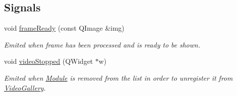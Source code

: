 \subsection*{Signals}
\begin{DoxyCompactItemize}
\item 
void \hyperlink{class_module_aca320affcf9e924d453e41afccb2c038}{frameReady} (const QImage \&img)
\begin{DoxyCompactList}\small\item\em Emited when frame has been processed and is ready to be shown. \item\end{DoxyCompactList}\item 
void \hyperlink{class_module_abee88121a38e84eb969ba6f52eb5761b}{videoStopped} (QWidget $\ast$w)
\begin{DoxyCompactList}\small\item\em Emited when \hyperlink{class_module}{Module} is removed from the list in order to unregister it from \hyperlink{class_video_gallery}{VideoGallery}. \item\end{DoxyCompactList}\end{DoxyCompactItemize}
